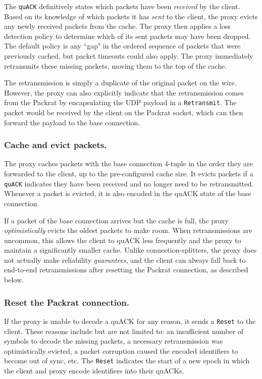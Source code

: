 The \texttt{quACK} definitively states which packets have been \textit{received}
by the client. Based on its knowledge of which packets it has \textit{sent} to
the client, the proxy evicts any newly received packets from the cache. The
proxy then applies a loss detection policy to determine which of its sent
packets may have been dropped. The default
policy is any ``gap" in the ordered sequence of packets that were previously
cached, but packet timeouts could also apply. The proxy immediately retransmits
these missing packets, moving them to the top of the cache.

The retransmission is simply a duplicate of the original packet on the wire.
However, the proxy can also explicitly indicate that the retransmission comes
from the Packrat by encapsulating the UDP payload in a \texttt{Retransmit}. The
packet would be received by the client on the Packrat socket, which can then forward
the payload to the base connection.

\subsubsection{Cache and evict packets.}

The proxy caches packets with the base connection 4-tuple in the order they are
forwarded to the client, up to the pre-configured cache size. It evicts packets
if a \texttt{quACK} indicates they have been received and no longer need to be
retransmitted. Whenever a packet is evicted, it is also encoded in the quACK
state of the base connection.

If a packet of the base connection arrives but the cache is full, the
proxy \textit{optimistically} evicts the oldest packets to make room. When
retransmissions are uncommon, this allows the client to quACK less frequently
and the proxy to maintain a significantly smaller cache. Unlike
connection-splitters, the proxy does not actually make reliability \textit
{guarantees}, and the client can always fall back to end-to-end retransmissions
after resetting the Packrat connection, as described below.

\subsubsection{Reset the Packrat connection.}

If the proxy is unable to decode a quACK for any reason, it sends a \texttt
{Reset} to the client. These reasons include but are not limited to: an
insufficient number of symbols to decode the missing packets, a necessary
retransmission was optimistically evicted,
a packet corruption caused the encoded identifiers
to become out of sync, etc. The \texttt{Reset} indicates the start of a new
epoch in which the client and proxy encode identifiers into their quACKs.

